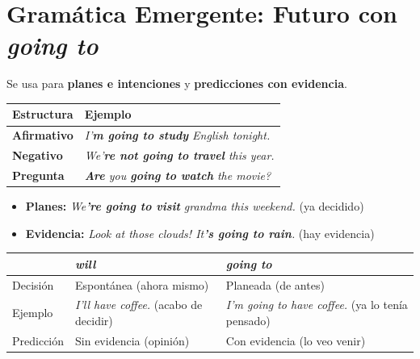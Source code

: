 \documentclass[12pt,a4paper]{article}
\begin{document}
\section{Gramática Emergente: Futuro con \textit{going to}}

\begin{cajagrammar}
Se usa para \textbf{planes e intenciones} y \textbf{predicciones con evidencia}.

\medskip
\begin{tabularx}{\textwidth}{@{} l X @{}}
\toprule
\textbf{Estructura} & \textbf{Ejemplo} \\
\midrule
\textbf{Afirmativo} & \textit{I'\textbf{m going to study} English tonight.} \\
\textbf{Negativo} & \textit{We'\textbf{re not going to travel} this year.} \\
\textbf{Pregunta} & \textit{\textbf{Are} you \textbf{going to watch} the movie?} \\
\bottomrule
\end{tabularx}

\medskip
\begin{cajaejemplo}
\begin{itemize}[nosep, leftmargin=0.8cm]
  \item \textbf{Planes:} \textit{We\textbf{'re going to visit} grandma this weekend.} (ya decidido)
  \item \textbf{Evidencia:} \textit{Look at those clouds! It\textbf{'s going to rain}.} (hay evidencia)
\end{itemize}
\end{cajaejemplo}
\end{cajagrammar}

\begin{cajagrammar}
\begin{tabularx}{\textwidth}{@{} l X X @{}}
\toprule
& \textbf{\textit{will}} & \textbf{\textit{going to}} \\
\midrule
Decisión & Espontánea (ahora mismo) & Planeada (de antes) \\
Ejemplo & \textit{I'll have coffee.} (acabo de decidir) & \textit{I'm going to have coffee.} (ya lo tenía pensado) \\
Predicción & Sin evidencia (opinión) & Con evidencia (lo veo venir) \\
\bottomrule
\end{tabularx}
\end{cajagrammar}
\end{document}
